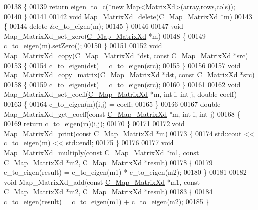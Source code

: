 \begin{DoxyCode}
00138 \{
00139   \textcolor{keywordflow}{return} eigen\_to\_c(*\textcolor{keyword}{new} \hyperlink{group___core___module_class_eigen_1_1_map}{Map<MatrixXd>}(array,rows,cols));
00140 \}
00141 
00142 \textcolor{keywordtype}{void} Map\_MatrixXd\_delete(\hyperlink{struct_c___map___matrix_xd}{C\_Map\_MatrixXd} *m)
00143 \{
00144   \textcolor{keyword}{delete} &c\_to\_eigen(m);
00145 \}
00146 
00147 \textcolor{keywordtype}{void} Map\_MatrixXd\_set\_zero(\hyperlink{struct_c___map___matrix_xd}{C\_Map\_MatrixXd} *m)
00148 \{
00149   c\_to\_eigen(m).setZero();
00150 \}
00151 
00152 \textcolor{keywordtype}{void} Map\_MatrixXd\_copy(\hyperlink{struct_c___map___matrix_xd}{C\_Map\_MatrixXd} *dst, \textcolor{keyword}{const} \hyperlink{struct_c___map___matrix_xd}{C\_Map\_MatrixXd} *src)
00153 \{
00154   c\_to\_eigen(dst) = c\_to\_eigen(src);
00155 \}
00156 
00157 \textcolor{keywordtype}{void} Map\_MatrixXd\_copy\_matrix(\hyperlink{struct_c___map___matrix_xd}{C\_Map\_MatrixXd} *dst, \textcolor{keyword}{const} 
      \hyperlink{struct_c___matrix_xd}{C\_MatrixXd} *src)
00158 \{
00159   c\_to\_eigen(dst) = c\_to\_eigen(src);
00160 \}
00161 
00162 \textcolor{keywordtype}{void} Map\_MatrixXd\_set\_coeff(\hyperlink{struct_c___map___matrix_xd}{C\_Map\_MatrixXd} *m, \textcolor{keywordtype}{int} i, \textcolor{keywordtype}{int} j, \textcolor{keywordtype}{double} coeff)
00163 \{
00164   c\_to\_eigen(m)(i,j) = coeff;
00165 \}
00166 
00167 \textcolor{keywordtype}{double} Map\_MatrixXd\_get\_coeff(\textcolor{keyword}{const} \hyperlink{struct_c___map___matrix_xd}{C\_Map\_MatrixXd} *m, \textcolor{keywordtype}{int} i, \textcolor{keywordtype}{int} j)
00168 \{
00169   \textcolor{keywordflow}{return} c\_to\_eigen(m)(i,j);
00170 \}
00171 
00172 \textcolor{keywordtype}{void} Map\_MatrixXd\_print(\textcolor{keyword}{const} \hyperlink{struct_c___map___matrix_xd}{C\_Map\_MatrixXd} *m)
00173 \{
00174   std::cout << c\_to\_eigen(m) << std::endl;
00175 \}
00176 
00177 \textcolor{keywordtype}{void} Map\_MatrixXd\_multiply(\textcolor{keyword}{const} \hyperlink{struct_c___map___matrix_xd}{C\_Map\_MatrixXd} *m1, \textcolor{keyword}{const} 
      \hyperlink{struct_c___map___matrix_xd}{C\_Map\_MatrixXd} *m2, \hyperlink{struct_c___map___matrix_xd}{C\_Map\_MatrixXd} *result)
00178 \{
00179   c\_to\_eigen(result) = c\_to\_eigen(m1) * c\_to\_eigen(m2);
00180 \}
00181 
00182 \textcolor{keywordtype}{void} Map\_MatrixXd\_add(\textcolor{keyword}{const} \hyperlink{struct_c___map___matrix_xd}{C\_Map\_MatrixXd} *m1, \textcolor{keyword}{const} 
      \hyperlink{struct_c___map___matrix_xd}{C\_Map\_MatrixXd} *m2, \hyperlink{struct_c___map___matrix_xd}{C\_Map\_MatrixXd} *result)
00183 \{
00184   c\_to\_eigen(result) = c\_to\_eigen(m1) + c\_to\_eigen(m2);
00185 \}
\end{DoxyCode}
